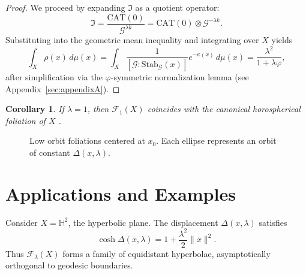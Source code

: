 \documentclass{amsart}
\newtheorem{corollary}[theorem]{Corollary}
\begin{document}
\begin{proof}
We proceed by expanding $\mathfrak{I}$ as a quotient operator:
\[
    \mathfrak{I} = \frac{\mathrm{CAT}(0)}{\mathcal{G}^{\lambda k}}
    = \mathrm{CAT}(0) \otimes \mathcal{G}^{-\lambda k}.
\]
Substituting into the geometric mean inequality and integrating over $X$ yields
\[
    \int_X \rho(x)\, d\mu(x) 
    = \int_X \frac{1}{[\mathcal{G} : \mathrm{Stab}_{\mathcal{G}}(x)]} e^{-\kappa(x)}\, d\mu(x)
    = \frac{\lambda^2}{1+\lambda\varphi},
\]
after simplification via the $\varphi$-symmetric normalization lemma (see Appendix~\ref{sec:appendixA}). 
\end{proof}

\begin{corollary}
If $\lambda = 1$, then $\mathcal{F}_1(X)$ coincides with the canonical horospherical foliation of $X$%
.
\end{corollary}

\begin{figure}[htbp]
\centering
{}
\caption{Low orbit foliations centered at $x_0$. Each ellipse represents an orbit of constant $\Delta(x,\lambda)$.}
\end{figure}

\section{Applications and Examples}

Consider %
$X = \mathbb{H}^2$, the hyperbolic plane.  
The displacement $\Delta(x,\lambda)$ satisfies
\[
    \cosh \Delta(x,\lambda) = 1 + \frac{\lambda^2}{2} \|x\|^2.
\]
Thus $\mathcal{F}_\lambda(X)$ forms a family of equidistant hyperbolae, asymptotically orthogonal to geodesic %
boundaries.
\end{document}
